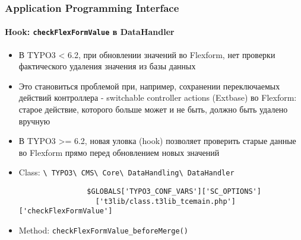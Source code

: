 \begin{frame}[fragile]
	\frametitle{Application Programming Interface}
	\framesubtitle{Hook: \texttt{checkFlexFormValue} в DataHandler}

	\begin{itemize}
		\item В TYPO3 < 6.2, при обновлении значений во Flexform, нет проверки фактического удаления значения из базы данных
		\item Это становиться проблемой при, например, сохранении переключаемых действий контроллера - switchable controller actions (Extbase) во Flexform: старое действие, которого больше может и не быть, должно быть удалено вручную

		\item В TYPO3 >= 6.2, новая уловка (hook) позволяет проверить старые данные во Flexform прямо перед обновлением новых значений
		\item Class:\newline
			\smaller
				\texttt{\textbackslash
					TYPO3\textbackslash
					CMS\textbackslash
					Core\textbackslash
					DataHandling\textbackslash
					DataHandler}\normalsize

			\lstset{
				basicstyle=\smaller\ttfamily
			}

			\begin{lstlisting}
				$GLOBALS['TYPO3_CONF_VARS']['SC_OPTIONS']
				  ['t3lib/class.t3lib_tcemain.php']['checkFlexFormValue']
			\end{lstlisting}

		\item Method:\newline
			\smaller
				\texttt{checkFlexFormValue\_beforeMerge()}

	\end{itemize}

\end{frame}


